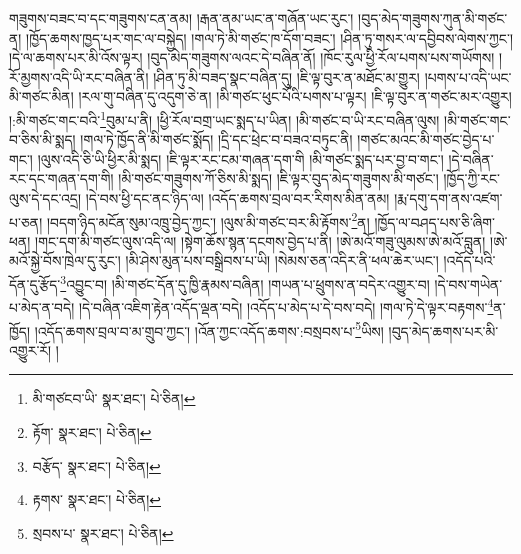 གཟུགས་བཟང་བ་དང་གཟུགས་ངན་ནམ། །རྒན་ནམ་ཡང་ན་གཞོན་ཡང་རུང་། །བུད་མེད་གཟུགས་ཀུན་མི་གཙང་ན། །ཁྱོད་ཆགས་ཁྱད་པར་གང་ལ་བསྐྱེད། །གལ་ཏེ་མི་གཙང་ཁ་དོག་བཟང་། །ཤིན་ཏུ་གསར་ལ་དབྱིབས་ལེགས་ཀྱང་། །དེ་ལ་ཆགས་པར་མི་འོས་ལྟར། །བུད་མེད་གཟུགས་ལའང་དེ་བཞིན་ནོ། །ཁོང་རུལ་ཕྱི་རོལ་པགས་པས་གཡོགས། །རོ་མྱགས་འདི་ཡི་རང་བཞིན་ནི། །ཤིན་ཏུ་མི་བཟད་སྣང་བཞིན་དུ། །ཇི་ལྟ་བུར་ན་མཐོང་མ་གྱུར། །པགས་པ་འདི་ཡང་མི་གཙང་མིན། །རལ་གུ་བཞིན་དུ་འདུག་ཅེ་ན། །མི་གཙང་ཕུང་པོའི་པགས་པ་ལྟར། །ཇི་ལྟ་བུར་ན་གཙང་མར་འགྱུར། །:མི་གཙང་གང་བའི་\footnote{མི་གཙངབ་ཡི་  སྣར་ཐང་།  པེ་ཅིན། }བུམ་པ་ནི། །ཕྱི་རོལ་བགྲ་ཡང་སྨད་པ་ཡིན། །མི་གཙང་བ་ཡི་རང་བཞིན་ལུས། །མི་གཙང་གང་བ་ཅིས་མི་སྨད། །གལ་ཏེ་ཁྱོད་ནི་མི་གཙང་སྨོད། །དྲི་དང་ཕྲེང་བ་བཟའ་བཏུང་ནི། །གཙང་མའང་མི་གཙང་བྱེད་པ་གང་། །ལུས་འདི་ཅི་ཡི་ཕྱིར་མི་སྨད། །ཇི་ལྟར་རང་ངམ་གཞན་དག་གི །མི་གཙང་སྨད་པར་བྱ་བ་གང་། །དེ་བཞིན་རང་དང་གཞན་དག་གི། །མི་གཙང་གཟུགས་ཀོ་ཅིས་མི་སྨད། །ཇི་ལྟར་བུད་མེད་གཟུགས་མི་གཙང་། །ཁྱོད་ཀྱི་རང་ལུས་དེ་དང་འདྲ། །དེ་བས་ཕྱི་དང་ནང་ཉིད་ལ། །འདོད་ཆགས་བྲལ་བར་རིགས་མིན་ནམ། །རྨ་དགུ་དག་ནས་འཛག་པ་ཅན། །བདག་ཉིད་མངོན་སུམ་འཁྲུ་བྱེད་ཀྱང་། །ལུས་མི་གཙང་བར་མི་རྟོགས་\footnote{རྟོག་  སྣར་ཐང་།  པེ་ཅིན། }ན། །ཁྱོད་ལ་བཤད་པས་ཅི་ཞིག་ཕན། །གང་དག་མི་གཙང་ལུས་འདི་ལ། །སྟེག་ཆོས་སྙན་དངགས་བྱེད་པ་ནི། །ཨེ་མའོ་གཟུ་ལུམས་ཨེ་མའོ་བླུན། །ཨེ་མའོ་སྐྱེ་བོས་ཁྲེལ་དུ་རུང་། །མི་ཤེས་མུན་པས་བསྒྲིབས་པ་ཡི། །སེམས་ཅན་འདིར་ནི་ཕལ་ཆེར་ཡང་། །འདོད་པའི་དོན་དུ་རྩོད་\footnote{བརྩོད་  སྣར་ཐང་།  པེ་ཅིན། }འབྱུང་བ། །མི་གཙང་དོན་དུ་ཁྱི་རྣམས་བཞིན། །གཡན་པ་ཕྲུགས་ན་བདེར་འགྱུར་བ། །དེ་བས་གཡེན་པ་མེད་ན་བདེ། །དེ་བཞིན་འཇིག་རྟེན་འདོད་ལྡན་བདེ། །འདོད་པ་མེད་པ་དེ་བས་བདེ། །གལ་ཏེ་དེ་ལྟར་བརྟགས་\footnote{རྟགས་  སྣར་ཐང་།  པེ་ཅིན། }ན་ཁྱོད། །འདོད་ཆགས་བྲལ་བ་མ་གྲུབ་ཀྱང་། །འོན་ཀྱང་འདོད་ཆགས་:བསྲབས་པ་\footnote{སྲབས་པ་  སྣར་ཐང་།  པེ་ཅིན། }ཡིས། །བུད་མེད་ཆགས་པར་མི་འགྱུར་རོ། །

